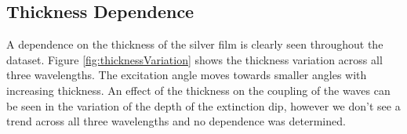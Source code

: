 \documentclass[%
reprint,
amsmath,amssymb,
aps,
]{revtex4-2}
\begin{document}
			\begin{table}[]
				\caption{A table of the dielectric constant of silver taken from M. Polyanskiy \cite{refractiveIndex}. Note that the imaginary component of $\epsilon_1$ is neglected as a first approximation.}
				\label{tab:dielectric}
			\end{table}
		
		
		\subsection{Thickness Dependence}
			
			A dependence on the thickness of the silver film is clearly seen throughout the dataset. Figure \ref{fig:thicknessVariation} shows the thickness variation across all three wavelengths. The excitation angle moves towards smaller angles with increasing thickness. An effect of the thickness on the coupling of the waves can be seen in the variation of the depth of the extinction dip, however we don't see a trend across all three wavelengths and no dependence was determined.
			
			
	
\end{document}

